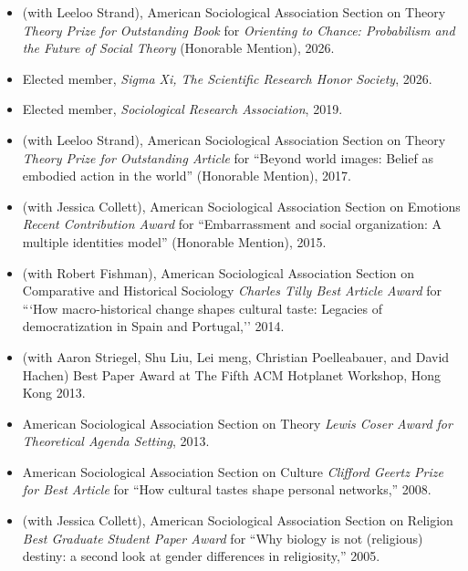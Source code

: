 \begin{itemize}[itemsep=0.5ex]

\item[--] (with Leeloo Strand), American Sociological Association Section on Theory {\em Theory Prize for Outstanding Book} for {\em Orienting to Chance: Probabilism and the Future of Social Theory} (Honorable Mention), 2026.

\item[--] Elected member, {\em Sigma Xi, The Scientific Research Honor Society}, 2026.

\item[--] Elected member, {\em Sociological Research Association}, 2019. 

\item[--] (with Leeloo Strand), American Sociological Association Section on Theory {\em Theory Prize for Outstanding Article} for ``Beyond world images: Belief as embodied action in the world'' (Honorable Mention), 2017.

\item[--] (with Jessica Collett), American Sociological Association Section on Emotions {\em Recent Contribution Award} for ``Embarrassment and social organization: A multiple identities model'' (Honorable Mention), 2015.

\item[--] (with Robert Fishman), American Sociological Association Section on Comparative and Historical Sociology {\em Charles Tilly Best Article Award} for ```How macro-historical change shapes cultural taste: Legacies of democratization in Spain and Portugal,'' 2014.

\item[--] (with Aaron Striegel, Shu Liu, Lei meng, Christian Poelleabauer, and David Hachen) Best Paper Award at The Fifth ACM Hotplanet Workshop, Hong Kong 2013.

\item[--] American Sociological Association Section on Theory {\em Lewis Coser Award for Theoretical Agenda Setting}, 2013.

\item[--] American Sociological Association Section on Culture  {\em Clifford Geertz Prize for Best Article} for ``How cultural tastes shape personal networks,'' 2008.

\item[--] (with Jessica Collett), American Sociological Association Section on Religion  {\em Best Graduate Student Paper Award} for ``Why biology is not (religious) destiny: a second look at gender differences in religiosity,''   2005.


\end{itemize}
